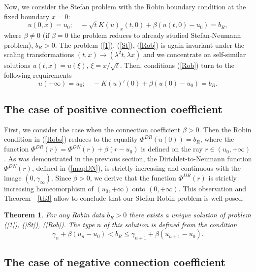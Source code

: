 \documentclass[12pt]{article}
\theoremstyle{plain}
\newtheorem{theorem}{Theorem}[section]
\theoremstyle{definition}
\numberwithin{equation}{section}
\begin{document}
Now, we consider the Stefan problem with the Robin boundary condition at the fixed boundary $x=0$:
\begin{equation}\label{Rob}
u(0,x)=u_0; \quad -\sqrt{t}K(u)_x(t,0)+\beta(u(t,0)-u_0)=b_R,
\end{equation}
where $\beta\not=0$ (if $\beta=0$ the problem reduces to already studied Stefan-Neumann problem), $b_R>0$.
The problem (\ref{1}), (\ref{St}), (\ref{Rob}) is again invariant under the scaling transformations $(t,x)\to (\lambda^2 t,\lambda x)$ and we concentrate on self-similar solutions $u(t,x)=u(\xi)$, $\xi=x/\sqrt{t}$. Then, conditions (\ref{Rob})
turn to the following requirements
\begin{equation}\label{Robs}
u(+\infty)=u_0; \quad -K(u)'(0)+\beta(u(0)-u_0)=b_R.
\end{equation}

\subsection{The case of positive connection coefficient}\label{sec3pos}

First, we consider the case when the connection coefficient $\beta>0$. Then the Robin condition in (\ref{Robs}) reduces
to the equality $\Phi^{DR}(u(0))=b_R$, where the function $\Phi^{DR}(r)=\Phi^{DN}(r)+\beta(r-u_0)$ is defined on the ray
$r\in (u_0,+\infty)$. As was demonstrated in the previous section, the Dirichlet-to-Neumann function $\Phi^{DN}(r)$, defined in (\ref{mapDN}), is strictly increasing and continuous with the image $(0,\gamma_\infty)$. Since $\beta>0$, we derive that the function $\Phi^{DR}(r)$ is strictly increasing homeomorphism of $(u_0,+\infty)$ onto $(0,+\infty)$. This observation and Theorem~~\ref{th3} allow to conclude that our Stefan-Robin problem is well-posed:

\begin{theorem}\label{th6} For any Robin data $b_R>0$ there exists a unique solution of problem
(\ref{1}), (\ref{St}), (\ref{Rob}). The type $n$ of this solution is defined from the condition \[\gamma_n+\beta(u_n-u_0)<b_R\le\gamma_{n+1}+\beta(u_{n+1}-u_0).\]
\end{theorem}

\subsection{The case of negative connection coefficient}\label{sec3neg}
\end{document}
